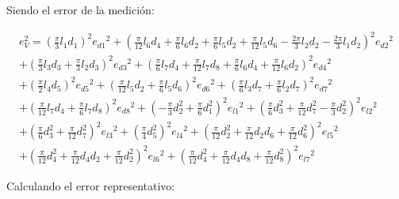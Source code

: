 \documentclass[letter,11pt]{article}
\begin{document}
Siendo el error de la medición:

\begin{equation}
\begin{split}
    e_V^2 = 
         \left(
            \frac{\pi}{3}l_1 d_1
        \right)^2{e_{d1}}^2
        +\left(
             \frac{\pi}{12}l_6 d_4+\frac{\pi}{6}l_6 d_2+\frac{\pi}{6}l_5 d_2
            +\frac{\pi}{12}l_5 d_6-\frac{2\pi}{3}l_2 d_2
            -\frac{2\pi}{3}l_1 d_2
        \right)^2{e_{d2}}^2 \\
        +\left(
            \frac{\pi}{3}l_3 d_3+\frac{\pi}{3}l_2 d_3
        \right)^2{e_{d3}}^2
        +\left(
             \frac{\pi}{6}l_7 d_4+\frac{\pi}{12}l_7 d_8
            +\frac{\pi}{6}l_6 d_4+\frac{\pi}{12}l_6 d_2
        \right)^2{e_{d4}}^2 \\
        +\left(
            \frac{\pi}{2}l_4 d_5
        \right)^2{e_{d5}}^2
        +\left(
            \frac{\pi}{12}l_5 d_2+\frac{\pi}{6}l_5 d_6
        \right)^2{e_{d6}}^2
        +\left(
            \frac{\pi}{6}l_3 d_7+\frac{\pi}{6}l_2 d_7
        \right)^2{e_{d7}}^2 \\
        +\left(
             \frac{\pi}{12}l_7 d_4+\frac{\pi}{6}l_7 d_8
        \right)^2{e_{d8}}^2
        +\left(
            -\frac{\pi}{3}d_2^2+\frac{\pi}{6}d_1^2
        \right)^2{e_{l1}}^2
        +\left(
            \frac{\pi}{6}d_3^2+\frac{\pi}{12}d_7^2-\frac{\pi}{3}d_2^2
        \right)^2{e_{l2}}^2 \\
        +\left(
            \frac{\pi}{6}d_3^2+\frac{\pi}{12}d_7^2
        \right)^2{e_{l3}}^2
        +\left(
            \frac{\pi}{4}d_5^2
        \right)^2{e_{l4}}^2
        +\left(
            \frac{\pi}{12}d_2^2+\frac{\pi}{12}d_2 d_6+\frac{\pi}{12}d_6^2
        \right)^2{e_{l5}}^2 \\
        +\left(
            \frac{\pi}{12}d_4^2+\frac{\pi}{12}d_4 d_2+\frac{\pi}{12}d_2^2
        \right)^2{e_{l6}}^2
        +\left(
            \frac{\pi}{12}d_4^2+\frac{\pi}{12}d_4 d_8+\frac{\pi}{12}d_8^2
        \right)^2{e_{l7}}^2
\end{split}
\end{equation}

Calculando el error representativo:
\end{document}
